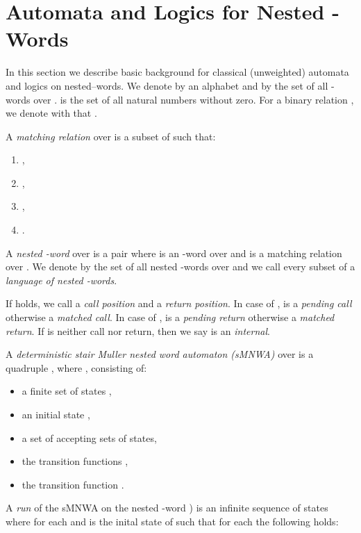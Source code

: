\documentclass[runningheads, envcountsame, a4paper]{llncs}
\begin{document}
\section{Automata and Logics for Nested -Words}
\label{chapnw}
In this section we describe basic background for classical (unweighted) automata and logics on nested--words. We denote by  an alphabet
and by  the set of all -words over .  is the set of all natural numbers without zero. For a binary relation , we denote with  that .
\begin{Def}
	 A \emph{matching relation}  over  is a subset of  such that:
	\begin{enumerate}[\quad(i)]
		\item , 
		\item , 
		\item , 
		\item .
	\end{enumerate}
A \emph{nested -word}  over  is a pair  where  is an -word over  and  is a matching relation over .
	We denote by  the set of all nested -words over  and we call every subset of  a \emph{language of nested -words}.
\end{Def}
	If  holds, we call  a \emph {call position} and  a \emph{return position}. In case of ,  is a \emph{pending call} otherwise a \emph{matched call}. In case of ,  is a \emph{pending return} otherwise a \emph{matched return}. If  is neither call nor return, then we say  is an \emph{internal}. 
\begin{Def}
	A \emph{deterministic stair Muller nested word automaton (sMNWA)} over  is a quadruple , where , consisting of:
\begin{itemize}
		\item a finite set of states ,
		\item an initial state ,
		\item a set  of accepting sets of states,
		\item the transition functions ,
 		\item the transition function . 
	\end{itemize}	
\end{Def}
A \emph{run}  of the sMNWA  on the nested -word ) is an infinite sequence of states  
where  for each  
and  is the inital state of  such that for each  the following holds:
\end{document}
